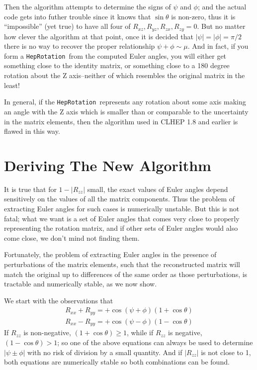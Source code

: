 \documentclass[twoside,12pt]{article}
\def \Ro {{\tt HepRotation}}
\begin{document}
Then the algorithm attempts to determine the signs of $\psi$ and $\phi$; 
and the actual code gets into futher trouble since it knows that $\sin \theta$
is non-zero, thus it is ``impossible'' (yet true) to have all four of 
$R_{xz}, R_{yz}, R_{zx}, R_{zy} = 0$.  
But no matter how clever the algorithm at that point, once it is decided that
$ |\psi| = |\phi| = \pi /2$ there is no way to recover the proper relationship
$\psi + \phi \sim \mu$.  And in fact, if you form a \Ro\ from the computed
Euler angles, you will either get something close to the identity matrix, or 
something close to a 180 degree 
rotation about the Z axis--neither of which resembles
the original matrix in the least!

In general, if the \Ro\ represents any rotation about some axis making an angle 
with the Z axis which is smaller than or comparable to the uncertainty in the
matrix elements, then the algorithm used in CLHEP 1.8 and earlier is flawed
in this way.

\section{Deriving The New Algorithm}

It is true that for $1 - |R_{zz}|$ small, the exact values of Euler angles 
depend  sensitively on the values of all the matrix components.  Thus
the problem of extracting Euler angles for such cases is numerically unstable.
But this is
not fatal; what we want is a set of Euler angles that comes very close to
properly representing the rotation matrix, 
and if other sets of Euler angles would
also come close, we don't mind not finding them.
 
Fortunately, the problem of extracting Euler angles in the presence of 
perturbations of the matrix elements, such that the reconstructed matrix will 
match the original up to differences of the same order as those perturbations,
is tractable and numerically stable, as we now show.  

We start with the observations that 
\begin{eqnarray}
R_{xx} + R_{yy} = + \cos ( \psi + \phi ) (1 + \cos \theta) \\
R_{xx} - R_{yy} = + \cos ( \psi - \phi ) (1 - \cos \theta) 
\end{eqnarray}
If $R_{zz}$ is non-negative, $(1 + \cos \theta) \geq 1$, while 
if $R_{zz}$ is negative, $(1 - \cos \theta) > 1$; so one of the
above equations can always be used to determine $|\psi \pm \phi|$ with no
risk of division by a small quantity.  And if $|R_{zz}|$ is not close to 1,
both equations are numerically stable so both combinations can be found. 
\end{document}
